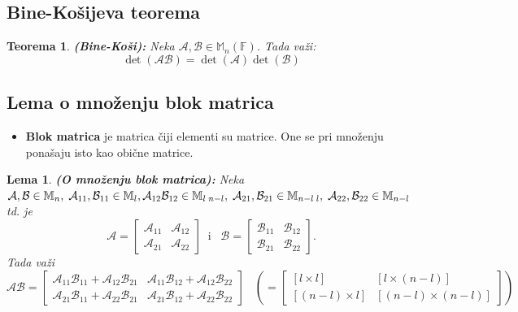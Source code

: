 \documentclass[a4paper,12pt,twoside]{report}
\newtheorem{theorem}{Teorema}[section]
\newtheorem{lemma}{Lema}[section]
\numberwithin{algorithm}{section}
\begin{document}
\subsection{Bine-Košijeva teorema}
\begin{theorem}
    \textbf{(Bine-Koši):} Neka $\mathcal{A}, \mathcal{B} \in \mathbb{M}_n(\mathbb{F})$. Tada važi:
    \[ \det (\mathcal{AB}) = \det (\mathcal{A}) \det (\mathcal{B}) \]
\end{theorem}

\subsection{Lema o množenju blok matrica}
\begin{itemize}
    \item \textbf{Blok matrica} je matrica čiji elementi su matrice. One se pri množenju ponašaju isto kao obične matrice.
\end{itemize}

\begin{lemma}
    \textbf{(O množenju blok matrica):} Neka $\mathcal{A}, \mathcal{B} \in \mathbb{M}_n, \; \mathcal{A}_{11}, \mathcal{B}_{11} \in \mathbb{M}_{l}, \linebreak \mathcal{A}_{12}
    \mathcal{B}_{12} \in \mathbb{M}_{l \; n-l}, \; \mathcal{A}_{21},\mathcal{B}_{21} \in \mathbb{M}_{n-l \; l}, \; \mathcal{A}_{22}, \mathcal{B}_{22} \in \mathbb{M}_{n-l}$ td. je
    \[\mathcal{A} = \begin{bmatrix}
        \mathcal{A}_{11} & \mathcal{A}_{12} \\
        \mathcal{A}_{21} & \mathcal{A}_{22}
    \end{bmatrix} \;\;\text{i}\;\;\; \mathcal{B} = \begin{bmatrix}
        \mathcal{B}_{11} & \mathcal{B}_{12} \\
        \mathcal{B}_{21} & \mathcal{B}_{22}
    \end{bmatrix}.\] Tada važi
    \[ \mathcal{AB} = \begin{bmatrix}
        \mathcal{A}_{11}\mathcal{B}_{11} + \mathcal{A}_{12}\mathcal{B}_{21} & \mathcal{A}_{11}\mathcal{B}_{12} + \mathcal{A}_{12}\mathcal{B}_{22} \\
        \mathcal{A}_{21}\mathcal{B}_{11} + \mathcal{A}_{22}\mathcal{B}_{21} & \mathcal{A}_{21}\mathcal{B}_{12} + \mathcal{A}_{22}\mathcal{B}_{22}
    \end{bmatrix} \;\;\; \left( = \begin{bmatrix}
        [l \times l] & [l \times (n-l)] \\
        [(n-l) \times l] & [(n-l) \times (n-l)]
    \end{bmatrix} \right)\]
\end{lemma}
\end{document}

